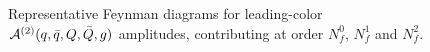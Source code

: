 \begin{figure}[ht]
  \begin{center}
\end{center} 
\caption{Representative Feynman diagrams for leading-color
$\mathcal{A}^{(2)}(q,\bar q,Q,\bar Q,g)$ amplitudes, 
contributing at order
$N_f^0$, $N_f^1$ and $N_f^2$.}
\label{fig_parents4q1g}
\end{figure}

